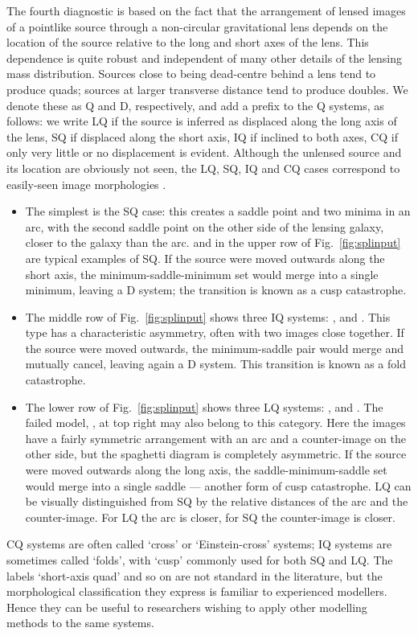 The fourth diagnostic is based on the fact that the arrangement of
lensed images of a pointlike source through a non-circular
gravitational lens depends on the location of the source relative to
the long and short axes of the lens.  This dependence is quite robust
and independent of many other details of the lensing mass
distribution.  Sources close to being dead-centre behind a lens tend
to produce quads; sources at larger transverse distance tend to
produce doubles.  We denote these as Q and D, respectively, and add a
prefix to the Q systems, as follows: we write LQ if the source is
inferred as displaced along the long axis of the lens, SQ if displaced
along the short axis, IQ if inclined to both axes, CQ if only very little or
no displacement is evident.  Although the
unlensed source and its location are obviously not seen, the LQ, SQ, IQ and CQ
cases correspond to easily-seen image morphologies \citep[see,
  e.g.,][]{2003AJ....125.2769S}.
\begin{itemize}
\item The simplest is the SQ case: this creates a saddle point and two
  minima in an arc, with the second saddle point on the other side of
  the lensing galaxy, closer to the galaxy than the arc.  
  and  in the upper row of Fig.~\ref{fig:splinput} are typical
  examples of SQ.  If the source were moved outwards along the short
  axis, the minimum-saddle-minimum set would merge into a single minimum,
  leaving a D system; the transition is known as a cusp catastrophe.
\item The middle row of Fig.~\ref{fig:splinput} shows three IQ
  systems: ,  and .  This type has a characteristic
  asymmetry, often with two images close together.  If the source
  were moved outwards, the minimum-saddle pair would merge and
  mutually cancel, leaving again a D system. This transition is known
  as a fold catastrophe.
\item The lower row of Fig.~\ref{fig:splinput} shows three LQ
  systems: ,  and . The failed model, , at top right
  may also belong to this category.  Here the images have a
  fairly symmetric arrangement with an arc and a counter-image on the
  other side, but the spaghetti diagram is completely asymmetric.  If
  the source were moved outwards along the long axis, the
  saddle-minimum-saddle set  would merge into a single saddle --- another
  form of cusp catastrophe.  LQ can be visually distinguished from SQ
  by the relative distances of the arc and the counter-image.  For
  LQ the arc is closer, for SQ the counter-image is closer.
\end{itemize}
CQ systems are often called `cross' or `Einstein-cross' systems; IQ
systems are sometimes called `folds', with `cusp' commonly used for
both SQ and LQ.  The labels `short-axis quad' and so on are not
standard in the literature, but the morphological classification they
express is familiar to experienced modellers.  Hence they can be
useful to researchers wishing to apply other modelling methods to the
same systems.

